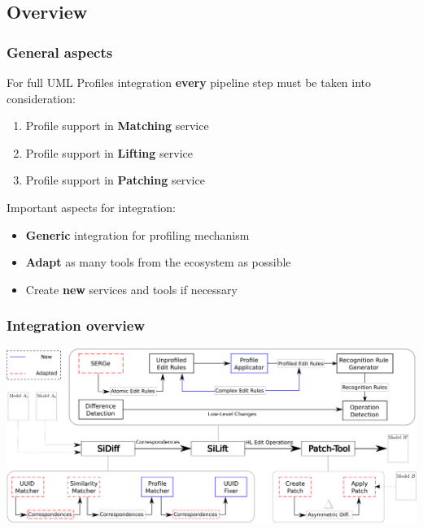 \documentclass[10pt]{beamer}
\begin{document}
\subsection{Overview}
\begin{frame}
\frametitle{General aspects}
For full UML Profiles integration \textbf{every} pipeline step must be taken
into consideration:\\
\begin{enumerate}
  \item Profile support in \textbf{Matching} service
  \item Profile support in \textbf{Lifting} service
  \item Profile support in \textbf{Patching} service
\end{enumerate}
\medskip
Important aspects for integration:
\begin{itemize}
  \item \textbf{Generic} integration for profiling mechanism
  \item \textbf{Adapt} as many tools from the ecosystem as possible
  \item Create \textbf{new} services and tools if necessary
\end{itemize}
\end{frame}
\begin{frame}
\frametitle{Integration overview}
\begin{center}
\includegraphics[scale=0.375]{integration_overview}\\
\end{center}
\end{frame}
\end{document}
